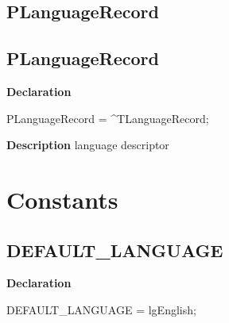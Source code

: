 \documentclass{report}
\newif\ifpdf
\begin{document}
\subsection*{\large{\textbf{PLanguageRecord}}\normalsize\hspace{1ex}\hrulefill}
\else
\subsection*{PLanguageRecord}
\fi
\label{PasDoc_Languages-PLanguageRecord}
\begin{list}{}{
\setlength{\itemindent}{0cm}
\setlength{\listparindent}{0cm}
\setlength{\leftmargin}{\evensidemargin}
\addtolength{\leftmargin}{\tmplength}
\settowidth{\labelsep}{X}
\addtolength{\leftmargin}{\labelsep}
\setlength{\labelwidth}{\tmplength}
}
\item[\textbf{Declaration}\hfill]
\ifpdf
\begin{flushleft}
\fi
\begin{ttfamily}
PLanguageRecord = {\^{}}TLanguageRecord;\end{ttfamily}

\ifpdf
\end{flushleft}
\fi

\par
\item[\textbf{Description}]
language descriptor

\end{list}
\section{Constants}
\ifpdf
\subsection*{\large{\textbf{DEFAULT{\_}LANGUAGE}}\normalsize\hspace{1ex}\hrulefill}
\else
\subsection*{DEFAULT{\_}LANGUAGE}
\fi
\label{PasDoc_Languages-DEFAULT_LANGUAGE}
\begin{list}{}{
\setlength{\itemindent}{0cm}
\setlength{\listparindent}{0cm}
\setlength{\leftmargin}{\evensidemargin}
\addtolength{\leftmargin}{\tmplength}
\settowidth{\labelsep}{X}
\addtolength{\leftmargin}{\labelsep}
\setlength{\labelwidth}{\tmplength}
}
\item[\textbf{Declaration}\hfill]
\ifpdf
\begin{flushleft}
\fi
\begin{ttfamily}
DEFAULT{\_}LANGUAGE = lgEnglish;\end{ttfamily}

\ifpdf
\end{flushleft}
\fi

\end{list}
\ifpdf
\end{document}
